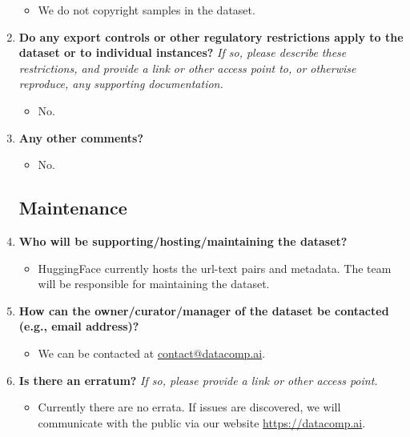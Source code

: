 \begin{enumerate}[label=Q\arabic*]
\begin{itemize}
\item We do not copyright samples in the dataset.
\end{itemize}

\item \textbf{Do any export controls or other regulatory restrictions apply to the dataset or to individual instances?} \textit{If so, please describe these restrictions, and provide a link or other access point to, or otherwise reproduce, any supporting documentation.}

\begin{itemize}
\item No.
\end{itemize}

\item \textbf{Any other comments?}

\begin{itemize}
\item No.
\end{itemize}

\subsection{Maintenance}

\item \textbf{Who will be supporting/hosting/maintaining the dataset?}

\begin{itemize}
\item HuggingFace currently hosts the url-text pairs and metadata. The \datanet team will be responsible for maintaining the dataset.
\end{itemize}

\item \textbf{How can the owner/curator/manager of the dataset be contacted (e.g., email address)?}

\begin{itemize}
\item We can be contacted at \url{contact@datacomp.ai}.
\end{itemize}

\item \textbf{Is there an erratum?} \textit{If so, please provide a link or other access point.}

\begin{itemize}
\item Currently there are no errata. If issues are discovered, we will communicate with the public via our website \url{https://datacomp.ai}.
\end{itemize}


\end{enumerate}
